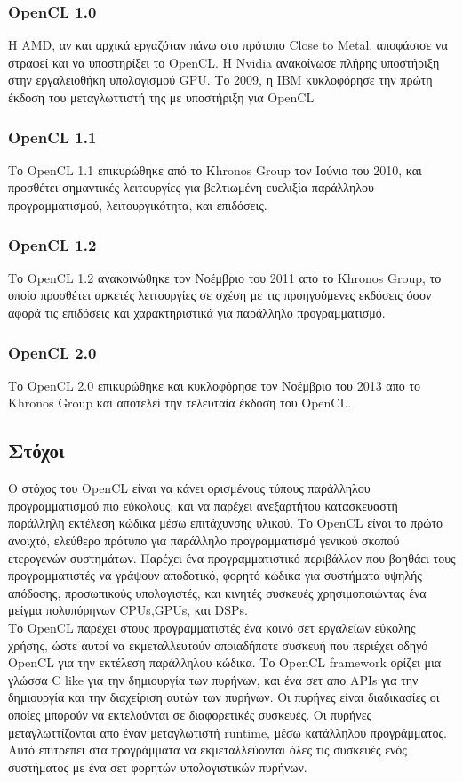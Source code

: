 \subsubsection{OpenCL 1.0} Η AMD, αν και αρχικά εργαζόταν πάνω στο πρότυπο Close to Metal, αποφάσισε να στραφεί και να υποστηρίξει το OpenCL. Η Nvidia ανακοίνωσε πλήρης υποστήριξη στην εργαλειοθήκη υπολογισμού GPU. Το 2009, η IBM κυκλοφόρησε την πρώτη έκδοση του μεταγλωττιστή της με υποστήριξη για OpenCL
\subsubsection{OpenCL 1.1} Το OpenCL 1.1 επικυρώθηκε από το Khronos Group τον Ιούνιο του 2010, και προσθέτει σημαντικές λειτουργίες για βελτιωμένη ευελιξία παράλληλου προγραμματισμού, λειτουργικότητα, και επιδόσεις.
\subsubsection{OpenCL 1.2} Το OpenCL 1.2 ανακοινώθηκε τον Νοέμβριο του 2011 απο το Khronos Group, το οποίο προσθέτει αρκετές λειτουργίες σε σχέση με τις προηγούμενες εκδόσεις όσον αφορά τις επιδόσεις και χαρακτηριστικά για παράλληλο προγραμματισμό.
\subsubsection{OpenCL 2.0} Το OpenCL 2.0 επικυρώθηκε και κυκλοφόρησε τον Νοέμβριο του 2013 απο το Khronos Group και αποτελεί την τελευταία έκδοση του OpenCL.


\subsection{Στόχοι}
Ο στόχος του OpenCL είναι να κάνει ορισμένους τύπους παράλληλου προγραμματισμού πιο εύκολους, και να παρέχει ανεξαρτήτου κατασκευαστή παράλληλη εκτέλεση κώδικα μέσω επιτάχυνσης υλικού. Το OpenCL είναι το πρώτο ανοιχτό, ελεύθερο πρότυπο για παράλληλο προγραμματισμό γενικού σκοπού ετερογενών συστημάτων. Παρέχει ένα προγραμματιστικό περιβάλλον που βοηθάει τους προγραμματιστές να γράψουν αποδοτικό, φορητό κώδικα για συστήματα υψηλής απόδοσης, προσωπικούς υπολογιστές, και κινητές συσκευές χρησιμοποιώντας ένα μείγμα πολυπύρηνων CPUs,GPUs, και DSPs.\\
Το OpenCL παρέχει στους προγραμματιστές ένα κοινό σετ εργαλείων εύκολης χρήσης, ώστε αυτοί να εκμεταλλευτούν οποιαδήποτε συσκευή που περιέχει οδηγό OpenCL για την εκτέλεση παράλληλου κώδικα. Το OpenCL framework ορίζει μια γλώσσα C like για την δημιουργία των πυρήνων, και ένα σετ απο APIs για την δημιουργία και την διαχείριση αυτών των πυρήνων. Οι πυρήνες είναι διαδικασίες οι οποίες μπορούν να εκτελούνται σε διαφορετικές συσκευές. Οι πυρήνες μεταγλωττίζονται απο έναν μεταγλωτιστή runtime, μέσω κατάλληλου προγράμματος. Αυτό επιτρέπει στα προγράμματα να εκμεταλλεύονται όλες τις συσκευές ενός συστήματος με ένα σετ φορητών υπολογιστικών πυρήνων.
